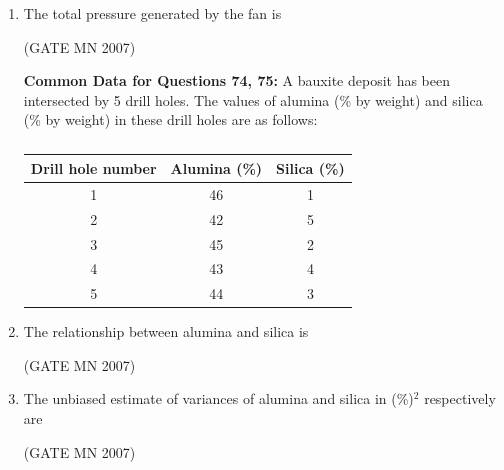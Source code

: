 \documentclass[journal]{IEEEtran}
\begin{document}
\begin{enumerate}
    \item The total pressure generated by the fan is  
	  
	    \hfill (GATE MN 2007)
    \begin{enumerate}
    \end{enumerate}


\textbf{Common Data for Questions 74, 75:}  
A bauxite deposit has been intersected by 5 drill holes. The values of alumina (\% by weight) and silica (\% by weight) in these drill holes are as follows:

\begin{table}[H]
    \centering\normalsize
\begin{tabular}{|c|c|c|}
\hline
Drill hole number & Alumina (\%) & Silica (\%) \\
\hline
1 & 46 & 1 \\
\hline
2 & 42 & 5 \\
\hline
3 & 45 & 2 \\
\hline
4 & 43 & 4 \\
\hline
5 & 44 & 3 \\
\hline
\end{tabular}
    \caption{}
    \label{tab:Q74&Q75}
\end{table}

    \item The relationship between alumina and silica is  
	    
	    \hfill (GATE MN 2007)
    \begin{enumerate}
    \end{enumerate}

    \item The unbiased estimate of variances of alumina and silica in (\%)$^2$ respectively are  
	    

	    \hfill (GATE MN 2007)
    \begin{enumerate}
    \end{enumerate}



\end{enumerate}
\end{document}
